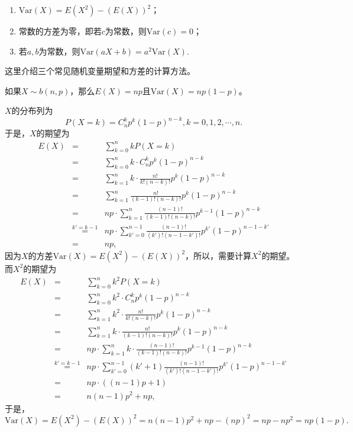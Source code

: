 \begin{property}
    \begin{enumerate}
        \item $\text{Var}(X) = E(X^2) - (E(X))^2$；
        \item 常数的方差为零，即若$c$为常数，则$\text{Var}(c) = 0$；
        \item 若$a,b$为常数，则$\text{Var}(aX+b) = a^2 \text{Var}(X)$.
    \end{enumerate}
\end{property}
\begin{note}
    \vspace{5cm}
\end{note}




这里介绍三个常见随机变量期望和方差的计算方法。
\begin{example}
    如果$X\sim b(n,p)$，那么$E(X) = np$且$\text{Var}(X) = np(1-p)$。
\end{example}
\begin{solution}
$X$的分布列为
    $$
    P(X=k) = C_n^k p^k (1-p)^{n-k},k = 0,1,2,\cdots,n.
    $$
于是，$X$的期望为
\begin{eqnarray*}
    E(X) &=& \sum_{k=0}^n k P(X=k)\\
    &=& \sum_{k=0}^n k \cdot C_n^k p^k (1-p)^{n-k}\\
    &=& \sum_{k=1}^n k\cdot \frac{n!}{k!(n-k)!} p^k (1-p)^{n-k}\\
 &=& \sum_{k=1}^n \frac{n!}{(k-1)!(n-k)!} p^k (1-p)^{n-k}\\
 &=& np\cdot \sum_{k=1}^n \frac{(n-1)!}{(k-1)!(n-k)!} p^{k-1} (1-p)^{n-k}\\
 &\overset{k'=k-1}{=}& np\cdot \sum_{k'=0}^{n-1} \frac{(n-1)!}{(k')!(n-1-k')!} p^{k'} (1-p)^{n-1-k'}\\
 &=& np,
\end{eqnarray*}
因为$X$的方差$\text{Var}(X) = E(X^2) - (E(X))^2$，所以，需要计算$X^2$的期望。而$X^2$的期望为
\begin{eqnarray*}
    E(X) &=& \sum_{k=0}^n k^2 P(X=k)\\
    &=& \sum_{k=0}^n k^2\cdot  C_n^k p^k (1-p)^{n-k}\\
    &=& \sum_{k=1}^n k^2\cdot \frac{n!}{k!(n-k)!} p^k (1-p)^{n-k}\\
 &=& \sum_{k=1}^n k\cdot \frac{n!}{(k-1)!(n-k)!} p^k (1-p)^{n-k}\\
 &=& np\cdot \sum_{k=1}^n k\cdot  \frac{(n-1)!}{(k-1)!(n-k)!} p^{k-1} (1-p)^{n-k}\\
 &\overset{k'=k-1}{=}& np\cdot \sum_{k'=0}^{n-1} (k'+1) \frac{(n-1)!}{(k')!(n-1-k')!} p^{k'} (1-p)^{n-1-k'}\\
 &=& np\cdot ((n-1)p+1) \\
 &=& n(n-1)p^2 + np,
\end{eqnarray*}
于是，
$$\text{Var}(X) = E(X^2) - (E (X))^2 = n(n-1)p^2 + np - (np)^2 = np - np^2 = np(1-p).$$
\end{solution}

